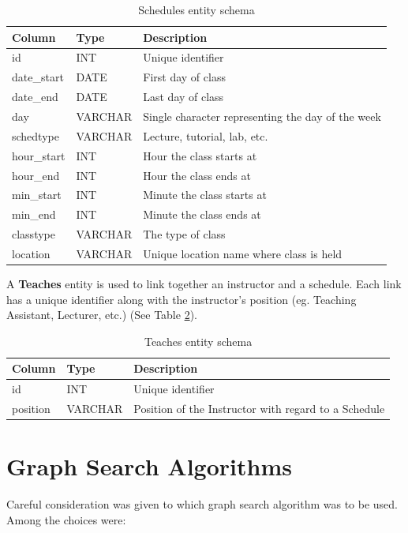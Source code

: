 \documentclass[12pt,letterpaper,oneside,notitlepage]{report}
\theoremstyle{definition}
\begin{document}
			\begin{table}[!htp]
				\centering
				\begin{tabular}{lll}
					\toprule
					Column & Type & Description \\
					\midrule
					id & INT & Unique identifier \\
					date\_start & DATE & First day of class \\
					date\_end & DATE & Last day of class \\
					day & VARCHAR & Single character representing the day of the week \\
					schedtype & VARCHAR & Lecture, tutorial, lab, etc. \\
					hour\_start & INT & Hour the class starts at \\
					hour\_end & INT & Hour the class ends at \\
					min\_start & INT & Minute the class starts at \\
					min\_end & INT & Minute the class ends at \\
					classtype & VARCHAR & The type of class \\
					location & VARCHAR & Unique location name where class is held \\
					\bottomrule
				\end{tabular}
				\caption{Schedules entity schema}
				\label{tbl:schedules-entity-schema}
			\end{table}
			
			A \textbf{Teaches} entity is used to link together an instructor and a schedule.  Each link has a unique identifier along with the instructor's position (eg. Teaching Assistant, Lecturer, etc.) (See Table \ref{tbl:teaches-entity-schema}).
			
			\begin{table}[!htp]
				\centering
				\begin{tabular}{lll}
					\toprule
					Column & Type & Description \\
					\midrule
					id & INT & Unique identifier \\
					position & VARCHAR & Position of the Instructor with regard to a Schedule \\
					\bottomrule
				\end{tabular}
				\caption{Teaches entity schema}
				\label{tbl:teaches-entity-schema}
			\end{table}
		
		\section{Graph Search Algorithms}
		\label{sec:graph-search-algos}
			Careful consideration was given to which graph search algorithm was to be used.  Among the choices were:
			
\end{document}
